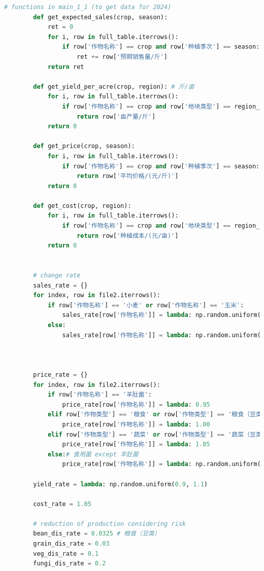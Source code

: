 \documentclass{cumcmthesis}
\begin{document}
\begin{appendices}
\begin{lstlisting}[language=python]
        # functions in main_1_1 (to get data for 2024)
        def get_expected_sales(crop, season):
            ret = 0
            for i, row in full_table.iterrows():
                if row['作物名称'] == crop and row['种植季次'] == season:
                    ret += row['预期销售量/斤']
            return ret
    
        def get_yield_per_acre(crop, region): # 斤/亩
            for i, row in full_table.iterrows():
                if row['作物名称'] == crop and row['地块类型'] == region_to_type[region]:
                    return row['亩产量/斤']
            return 0
        
        def get_price(crop, season):
            for i, row in full_table.iterrows():
                if row['作物名称'] == crop and row['种植季次'] == season:
                    return row['平均价格/(元/斤)']
            return 0
    
        def get_cost(crop, region):
            for i, row in full_table.iterrows():
                if row['作物名称'] == crop and row['地块类型'] == region_to_type[region]:
                    return row['种植成本/(元/亩)']
            return 0
        
    
        # change rate
        sales_rate = {}
        for index, row in file2.iterrows():
            if row['作物名称'] == '小麦' or row['作物名称'] == '玉米':
                sales_rate[row['作物名称']] = lambda: np.random.uniform(1.05, 1.10)
            else:
                sales_rate[row['作物名称']] = lambda: np.random.uniform(0.95, 1.05) #! TODO: potential misunderstanding
    
        
    
        price_rate = {}
        for index, row in file2.iterrows():
            if row['作物名称'] == '羊肚菌':
                price_rate[row['作物名称']] = lambda: 0.95
            elif row['作物类型'] == '粮食' or row['作物类型'] == '粮食（豆类）':
                price_rate[row['作物名称']] = lambda: 1.00
            elif row['作物类型'] == '蔬菜' or row['作物类型'] == '蔬菜（豆类）':
                price_rate[row['作物名称']] = lambda: 1.05
            else:# 食用菌 except 羊肚菌
                price_rate[row['作物名称']] = lambda: np.random.uniform(0.95, 0.99)
        
        yield_rate = lambda: np.random.uniform(0.9, 1.1)
    
        cost_rate = 1.05
    
        # reduction of production considering risk
        bean_dis_rate = 0.0325 # 粮食（豆类）
        grain_dis_rate = 0.03
        veg_dis_rate = 0.1
        fungi_dis_rate = 0.2
    

\end{lstlisting}
\end{appendices}
\end{document}
